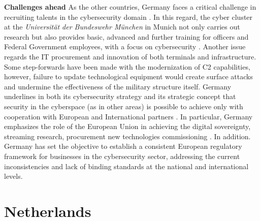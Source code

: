\textbf{Challenges ahead} As the other countries, Germany faces a critical challenge in recruiting talents in the cybersecurity domain \autocite{thefederalgovernmentofgermany_2023_robust, leinhos_2020_cyber}. In this regard, the cyber cluster at the \textit{Universität der Bundeswehr München} in Munich not only carries out research but also provides basic, advanced and further training for officers and Federal Government employees, with a focus on cybersecurity \autocite[25]{federalministryoftheinteriorbuildingandcommunity_2021_cyber}. Another issue regards the IT procurement and innovation of both terminals and infrastructure. Some step-forwards have been made with the modernization of C2 capabilities, however, failure to update technological equipment would create surface attacks and undermine the effectiveness of the military structure itself. Germany underlines in both its cybersecurity strategy and its strategic concept that security in the cyberspace (as in other areas) is possible to achieve only with cooperation with European and International partners \autocite[22]{federalministryoftheinteriorbuildingandcommunity_2021_cyber}. In particular, Germany emphasizes the role of the European Union in achieving the digital sovereignty, streaming research, procurement new technologies commissioning \autocite[23]{federalministryoftheinteriorbuildingandcommunity_2021_cyber}. In addition. Germany has set the objective to establish a consistent European regulatory framework for businesses in the cybersecurity sector, addressing the current inconsistencies and lack of binding standards at the national and international levels\autocite{federalministryoftheinteriorbuildingandcommunity_2021_cyber}.  

\section{Netherlands}

